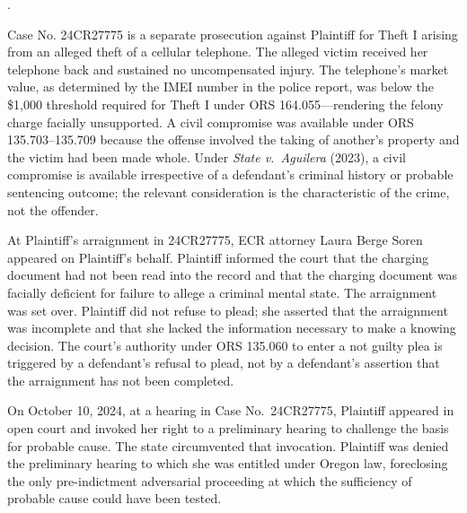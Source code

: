 \documentclass[12pt,letterpaper]{article}
\newcounter{complaintpara}
\newenvironment{paras}{%
	\begin{list}{\arabic{complaintpara}.}{%
			\setlength{\leftmargin}{0.5in}%
			\setlength{\labelwidth}{0.4in}%
			\setlength{\labelsep}{0.1in}%
			\setlength{\itemsep}{0pt}%
			\setlength{\parsep}{0pt}%
			\setlength{\topsep}{6pt}%
		}%
	}{%
	\end{list}%
}
\begin{document}
\begin{paras}
		\item\label{fact:27775-overview} Case No. 24CR27775 is a separate prosecution against Plaintiff for Theft I arising from an alleged theft of a cellular telephone. The alleged victim received her telephone back and sustained no uncompensated injury. The telephone's market value, as determined by the IMEI number in the police report, was below the \$1,000 threshold required for Theft I under ORS 164.055---rendering the felony charge facially unsupported. A civil compromise was available under ORS 135.703--135.709 because the offense involved the taking of another's property and the victim had been made whole. Under \textit{State v.\ Aguilera} (2023), a civil compromise is available irrespective of a defendant's criminal history or probable sentencing outcome; the relevant consideration is the characteristic of the crime, not the offender.\item\label{fact:27775-arraignment} At Plaintiff's arraignment in 24CR27775, ECR attorney Laura Berge Soren appeared on Plaintiff's behalf. Plaintiff informed the court that the charging document had not been read into the record and that the charging document was facially deficient for failure to allege a criminal mental state. The arraignment was set over. Plaintiff did not refuse to plead; she asserted that the arraignment was incomplete and that she lacked the information necessary to make a knowing decision. The court's authority under ORS 135.060 to enter a not guilty plea is triggered by a defendant's refusal to plead, not by a defendant's assertion that the arraignment has not been completed.\item\label{fact:prelim} On October 10, 2024, at a hearing in
		Case No.\ 24CR27775, Plaintiff appeared in open court and
		invoked her right to a preliminary hearing to challenge the
		basis for probable cause. The state circumvented that
		invocation. Plaintiff was denied the preliminary hearing to
		which she was entitled under Oregon law, foreclosing the only
		pre-indictment adversarial proceeding at which the sufficiency
		of probable cause could have been tested.
		

\end{paras}
\end{document}
